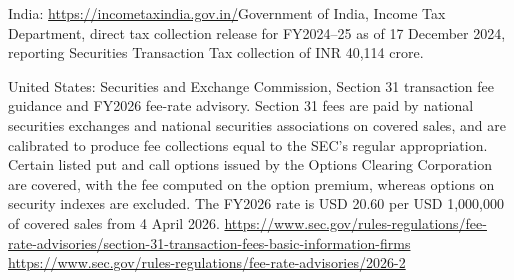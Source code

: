 \documentclass[../../main]{subfiles}
\begin{document}
\begin{footnotesize}
\begin{description}
\item India: \url{https://incometaxindia.gov.in/}{Government of India, Income Tax Department}, direct tax collection release for FY2024--25 as of 17 December 2024, reporting Securities Transaction Tax collection of INR 40,114 crore. 

\item United States: Securities and Exchange Commission, Section 31 transaction fee guidance and FY2026 fee-rate advisory. Section 31 fees are paid by national securities exchanges and national securities associations on covered sales, and are calibrated to produce fee collections equal to the SEC's regular appropriation. Certain listed put and call options issued by the Options Clearing Corporation are covered, with the fee computed on the option premium, whereas options on security indexes are excluded. The FY2026 rate is USD 20.60 per USD 1,000,000 of covered sales from 4 April 2026.
\url{https://www.sec.gov/rules-regulations/fee-rate-advisories/section-31-transaction-fees-basic-information-firms}  
\url{https://www.sec.gov/rules-regulations/fee-rate-advisories/2026-2}

\end{description}
\end{footnotesize}
\end{document}
